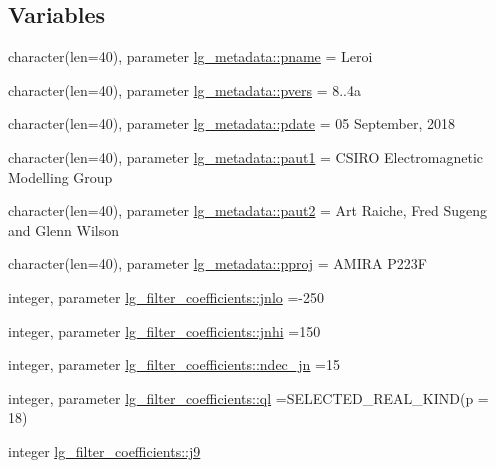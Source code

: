 \subsection*{Variables}
\begin{DoxyCompactItemize}
\item 
character(len=40), parameter \hyperlink{namespacelg__metadata_a55e96053795f7d02e8bbe4de8d6285c4}{lg\+\_\+metadata\+::pname} = \textquotesingle{}Leroi\textquotesingle{}
\item 
character(len=40), parameter \hyperlink{namespacelg__metadata_ac903068c6379390ca35b58c1a7e92078}{lg\+\_\+metadata\+::pvers} = \textquotesingle{}8..\+4a\textquotesingle{}
\item 
character(len=40), parameter \hyperlink{namespacelg__metadata_a337b7eb616ab5604cf3aa962030f7d07}{lg\+\_\+metadata\+::pdate} = \textquotesingle{}05 September, 2018\textquotesingle{}
\item 
character(len=40), parameter \hyperlink{namespacelg__metadata_a90d24b12239be94130b3edf2d1ff5b6c}{lg\+\_\+metadata\+::paut1} = \textquotesingle{}C\+S\+I\+RO Electromagnetic Modelling Group\textquotesingle{}
\item 
character(len=40), parameter \hyperlink{namespacelg__metadata_a11648f65295df5ce798120d00e06cba9}{lg\+\_\+metadata\+::paut2} = \textquotesingle{}Art Raiche, Fred Sugeng and Glenn Wilson\textquotesingle{}
\item 
character(len=40), parameter \hyperlink{namespacelg__metadata_ad73468f9426cf993204325cabad1cf55}{lg\+\_\+metadata\+::pproj} = \textquotesingle{}A\+M\+I\+RA P223F\textquotesingle{}
\item 
integer, parameter \hyperlink{namespacelg__filter__coefficients_a1f3daaa8f4dc759e683d1fd1139378a6}{lg\+\_\+filter\+\_\+coefficients\+::jnlo} =-\/250
\item 
integer, parameter \hyperlink{namespacelg__filter__coefficients_ac66b56e3000e305caa388d29b539336d}{lg\+\_\+filter\+\_\+coefficients\+::jnhi} =150
\item 
integer, parameter \hyperlink{namespacelg__filter__coefficients_afb30e9c5cfe2ccaaa85322c4a6721a6f}{lg\+\_\+filter\+\_\+coefficients\+::ndec\+\_\+jn} =15
\item 
integer, parameter \hyperlink{namespacelg__filter__coefficients_a6417faef3b543d16359fd03b39f7fcc5}{lg\+\_\+filter\+\_\+coefficients\+::ql} =S\+E\+L\+E\+C\+T\+E\+D\+\_\+\+R\+E\+A\+L\+\_\+\+K\+I\+ND(p = 18)
\item 
integer \hyperlink{namespacelg__filter__coefficients_a7884e6b538d3becc2f13d5bcbc6e540b}{lg\+\_\+filter\+\_\+coefficients\+::j9}

\end{DoxyCompactItemize}
